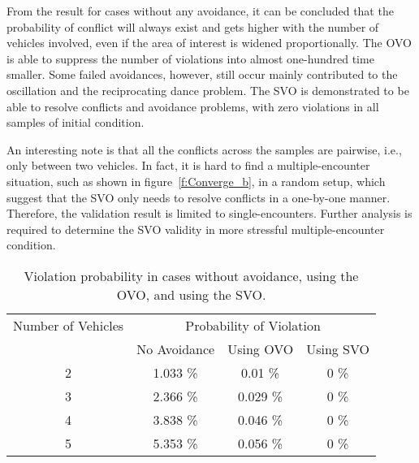 From the result for cases without any avoidance, it can be concluded that the probability of conflict will always exist and gets higher with the number of vehicles involved, even if the area of interest is widened proportionally. The OVO is able to suppress the number of violations into almost one-hundred time smaller. Some failed avoidances, however, still occur mainly contributed to the oscillation and the reciprocating dance problem\cite{Snape:11}. The SVO is demonstrated to be able to resolve conflicts and avoidance problems, with zero violations in all samples of initial condition. 

An interesting note is that all the conflicts across the samples are pairwise, i.e., only between two vehicles. In fact, it is hard to find a multiple-encounter situation, such as shown in figure~\ref{f:Converge_b}, in a random setup, which suggest that the SVO only needs to resolve conflicts in a one-by-one manner. Therefore, the validation result is limited to single-encounters. Further analysis is required to determine the SVO validity in more stressful multiple-encounter condition.   

\begin{table}[h!]
 \begin{center}

   \caption{Violation probability in cases without avoidance, using the OVO, and using the SVO.}
   \label{t:ProbResult}
   \begin{tabular}{cccc}
   \hline \hline
    Number of Vehicles & \multicolumn{3}{c}{Probability of Violation}\\
     & No Avoidance &  Using OVO\tnote{\dag} & Using SVO \\
    \hline
    2 & 1.033 \% & 0.01  \% & 0 \% \\
    3 & 2.366 \% & 0.029 \% & 0 \% \\
    4 & 3.838 \% & 0.046 \% & 0 \% \\
    5 & 5.353 \% & 0.056 \% & 0 \% \\
     \hline \hline
   \end{tabular}
 \end{center}
\end{table}

